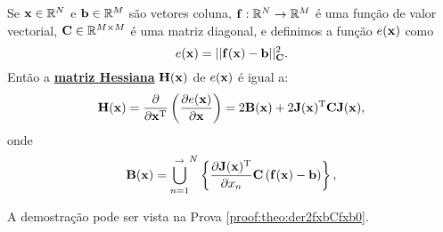 \begin{theorem}\label{theo:der2fxbCfxb0}
Se
$\VECTOR{x}\in \mathbb{R}^N$ e 
$\VECTOR{b}\in \mathbb{R}^M$ são vetores coluna,  
$\VECTOR{f}: \mathbb{R}^{N}\rightarrow \mathbb{R}^{M}$ é uma função de valor vectorial,
$\MATRIX{C} \in \mathbb{R}^{M\times M}$ é uma matriz diagonal, e
definimos a função $e(\VECTOR{x})$ como
\begin{equation}
e(\VECTOR{x})= ||\VECTOR{f}(\VECTOR{x})-\VECTOR{b}||_{\MATRIX{C}}^2.
\end{equation}
Então a \hyperref[def:hessian]{\textbf{matriz Hessiana}} $\MATRIX{H}(\VECTOR{x})$ de $e(\VECTOR{x})$ é igual a:
\begin{equation}
\MATRIX{H}(\VECTOR{x}) = \frac{\partial}{\partial \VECTOR{x}^{\transpose}}\left(  
\frac{\partial e(\VECTOR{x}) }{\partial \VECTOR{x}} \right) = 2 \MATRIX{B}(\VECTOR{x})
+2 \MATRIX{J}(\VECTOR{x})^{\transpose}\MATRIX{C} \MATRIX{J}(\VECTOR{x}),
\end{equation}
onde 
\begin{equation}
 \MATRIX{B}(\VECTOR{x})=
{\bigcup\limits_{n=1}^{ \rightarrow }}^{N}\left\{ \frac{\partial \MATRIX{J}(\VECTOR{x})^{\transpose} }{\partial x_{n}} \MATRIX{C} \left( \VECTOR{f}(\VECTOR{x})-\VECTOR{b}\right) \right\},
\end{equation}


A demostração pode ser vista na Prova \ref{proof:theo:der2fxbCfxb0}.
\end{theorem}


